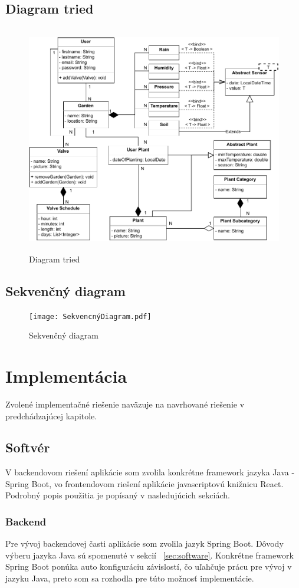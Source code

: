 \documentclass[twoside]{ctuthesis}
\theoremstyle{plain}
\theoremstyle{definition}
\theoremstyle{note}
\begin{document}
\section{Diagram tried}
\begin{figure}[H]
\includegraphics[width= 13 cm, height = 10cm]{ClassDiagram.pdf}
\caption{Diagram tried}
\label{fig:classDiagram}
\end{figure}

\section{Sekvenčný diagram}
\begin{figure}[H]
\texttt{[image: SekvencnýDiagram.pdf]}
\caption{Sekvenčný diagram}
\label{fig:sequenceDiagram}
\end{figure}

\chapter{Implementácia}
Zvolené implementačné riešenie naväzuje na navrhované riešenie v predchádzajúcej kapitole.

\section{Softvér}
V backendovom riešení aplikácie som zvolila konkrétne framework jazyka Java - Spring Boot, vo frontendovom riešení aplikácie javascriptovú knižnicu React. Podrobný popis použitia je popísaný v nasledujúcich sekciách.

\subsection{Backend}
Pre vývoj backendovej časti aplikácie som zvolila jazyk Spring Boot. Dôvody výberu jazyka Java sú spomenuté v sekcií ~\ref{sec:software}. Konkrétne framework Spring Boot ponúka auto konfiguráciu závislostí, čo uľahčuje prácu pre vývoj v jazyku Java, preto som sa rozhodla pre túto možnosť implementácie.
\end{document}
